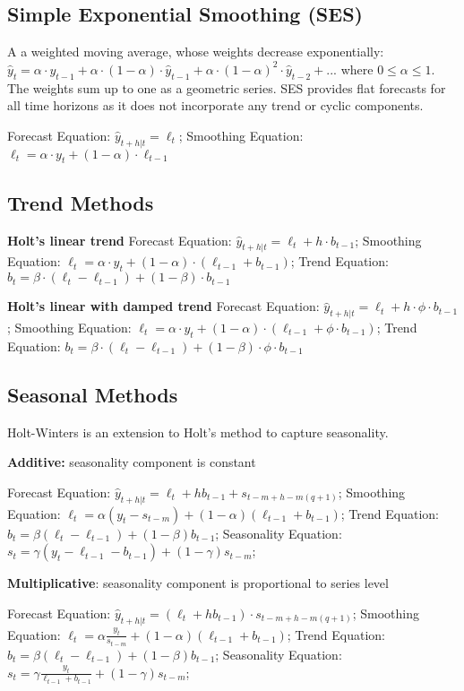 \documentclass[10pt, a4paper]{article}
\begin{document}
\subsection{Simple Exponential Smoothing (SES)}
A a weighted moving average, whose weights decrease exponentially:
$ \hat{y}_{t} = \alpha \cdot y_{t-1} + \alpha \cdot (1 - \alpha) \cdot \hat{y}_{t-1} + \alpha \cdot (1 - \alpha)^2 \cdot \hat{y}_{t-2} + ... $
where $ 0 \le \alpha \le 1 $. The weights sum up to one as a geometric series.
SES provides flat forecasts for all time horizons as it does not incorporate any trend or cyclic components.

Forecast Equation: $ \hat{y}_{t+h|t} = \ell_t $;
Smoothing Equation: $ \ell_t = \alpha \cdot y_t + (1 - \alpha) \cdot \ell_{t-1} $

\subsection{Trend Methods}
\textbf{Holt's linear trend}
Forecast Equation: $ \hat{y}_{t+h|t} = \ell_t + h \cdot b_{t-1} $;
Smoothing Equation: $ \ell_t = \alpha \cdot y_t + (1 - \alpha) \cdot (\ell_{t-1} + b_{t-1}) $;
Trend Equation: $ b_t = \beta \cdot (\ell_t - \ell_{t-1}) + (1 - \beta) \cdot b_{t-1} $

\textbf{Holt's linear with damped trend}
Forecast Equation: $ \hat{y}_{t+h|t} = \ell_t + h \cdot \phi \cdot b_{t-1} $;
Smoothing Equation: $ \ell_t = \alpha \cdot y_t + (1 - \alpha) \cdot (\ell_{t-1} + \phi \cdot b_{t-1}) $;
Trend Equation: $ b_t = \beta \cdot (\ell_t - \ell_{t-1}) + (1 - \beta) \cdot \phi \cdot b_{t-1} $

\subsection{Seasonal Methods}
Holt-Winters is an extension to Holt's method to capture seasonality.

\textbf{Additive:} seasonality component is constant

Forecast Equation: $ \hat{y}_{t+h|t} = \ell_t + hb_{t-1} + s_{t-m+h-m(q+1)} $;
Smoothing Equation: $ \ell_t = \alpha (y_t - s_{t-m}) + (1 - \alpha)(\ell_{t-1} + b_{t-1}) $;
Trend Equation: $ b_t = \beta (\ell_t - \ell_{t-1}) + (1 - \beta) b_{t-1} $;
Seasonality Equation: $ s_t = \gamma (y_t - \ell_{t-1} - b_{t-1}) + (1 - \gamma) s_{t-m} $;

\textbf{Multiplicative}: seasonality component is proportional to series level

Forecast Equation: $ \hat{y}_{t+h|t} = (\ell_t + hb_{t-1}) \cdot s_{t-m+h-m(q+1)} $;
Smoothing Equation: $ \ell_t = \alpha \frac{y_t}{s_{t-m}} + (1 - \alpha)(\ell_{t-1} + b_{t-1}) $;
Trend Equation: $ b_t = \beta (\ell_t - \ell_{t-1}) + (1 - \beta) b_{t-1} $;
Seasonality Equation: $ s_t = \gamma \frac{y_t}{\ell_{t-1} + b_{t-1}} + (1 - \gamma) s_{t-m} $;
\end{document}
